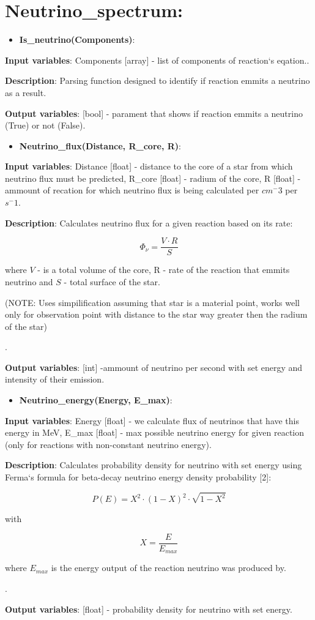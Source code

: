 \documentclass[a4paper,12pt]{article}
\newcommand{\namefunction}[4]{
  \begin{itemize}
    \item \textbf{#1}:
  \end{itemize}
  
  \textbf{Input variables}: #2.
  
  \textbf{Description}: #3.
  
  \textbf{Output variables}: #4.
}
\begin{document}
\section{Neutrino\_spectrum:}

\vspace{1em}

\namefunction{Is\_neutrino(Components)}{Components [array] - list of components of reaction`s eqation.}{Parsing function designed to identify if reaction emmits a neutrino as a result}{[bool] - parament that shows if reaction emmits a neutrino (True) or not (False)}

\vspace{1em}

\namefunction{Neutrino\_flux(Distance, R\_core, R)}{Distance [float] - distance to the core of a star from which neutrino flux must be predicted, R\_core [float] - radium of the core, R [float] - ammount of recation for which neutrino flux is being calculated per $cm^-3$ per $s^-1$}{Calculates neutrino flux for a given reaction based on its rate:

\[\Phi_\nu = \frac{V \cdot R}{S}\]

where $V$ - is a total volume of the core, R - rate of the reaction that emmits neutrino and $S$ - total surface of the star.

(NOTE: Uses simpilification assuming that star is a material point, works well only for observation point with distance to the star way greater then the radium of the star)

}{[int] -ammount of neutrino per second with set energy and intensity of their emission}

\vspace{1em}

\namefunction{Neutrino\_energy(Energy, E\_max)}{Energy [float] - we calculate flux of neutrinos that have this energy in MeV, E\_max [float] - max possible neutrino energy for given reaction (only for reactions with non-constant neutrino energy)}{Calculates probability density for neutrino with set energy using Ferma`s formula for beta-decay neutrino energy density probability [2]:

\[P(E) = X^{2} \cdot (1 - X)^{2} \cdot \sqrt{1 - X^{2}}\]

with

\[X = \frac{E}{E_{max}}\]

where $E_{max}$ is the energy output of the reaction neutrino was produced by.

}{[float] - probability density for neutrino with set energy}
\end{document}
